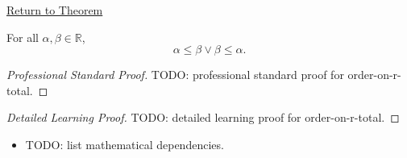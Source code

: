 \newpage
{}
\label{prf:order-on-r-total}

\begin{remark*}[Return]
\hyperref[thm:order-on-r-total]{Return to Theorem}
\end{remark*}

\begin{theorem*}
For all $\alpha,\beta\in\mathbb{R}$,
\[
\alpha\le\beta\lor\beta\le\alpha.
\]
\end{theorem*}

\begin{proof}[Professional Standard Proof]
\LRAProofBodyStart
TODO: professional standard proof for order-on-r-total.
\end{proof}

\begin{proof}[Detailed Learning Proof]
\LRAProofBodyStart
TODO: detailed learning proof for order-on-r-total.
\end{proof}

\begin{remark*}
\end{remark*}

\begin{dependencies}
\begin{itemize}
  \item TODO: list mathematical dependencies.
\end{itemize}
\end{dependencies}

\clearpage
